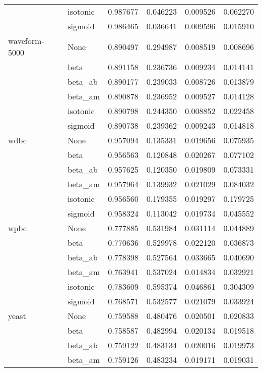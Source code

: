 \begin{tabular}{llrrrr}
        & isotonic &  0.987677 &  0.046223 &  0.009526 &  0.062270 \\
        & sigmoid &  0.986465 &  0.036641 &  0.009596 &  0.015910 \\
waveform-5000 & None &  0.890497 &  0.294987 &  0.008519 &  0.008696 \\
        & beta &  0.891158 &  0.236736 &  0.009234 &  0.014141 \\
        & beta\_ab &  0.890177 &  0.239033 &  0.008726 &  0.013879 \\
        & beta\_am &  0.890878 &  0.236952 &  0.009527 &  0.014128 \\
        & isotonic &  0.890798 &  0.244350 &  0.008852 &  0.022458 \\
        & sigmoid &  0.890738 &  0.239362 &  0.009243 &  0.014818 \\
wdbc & None &  0.957094 &  0.135331 &  0.019656 &  0.075935 \\
        & beta &  0.956563 &  0.120848 &  0.020267 &  0.077102 \\
        & beta\_ab &  0.957625 &  0.120350 &  0.019809 &  0.073331 \\
        & beta\_am &  0.957964 &  0.139932 &  0.021029 &  0.084032 \\
        & isotonic &  0.956560 &  0.179355 &  0.019297 &  0.179725 \\
        & sigmoid &  0.958324 &  0.113042 &  0.019734 &  0.045552 \\
wpbc & None &  0.777885 &  0.531984 &  0.031114 &  0.044889 \\
        & beta &  0.770636 &  0.529978 &  0.022120 &  0.036873 \\
        & beta\_ab &  0.778398 &  0.527564 &  0.033665 &  0.040690 \\
        & beta\_am &  0.763941 &  0.537024 &  0.014834 &  0.032921 \\
        & isotonic &  0.783609 &  0.595374 &  0.046861 &  0.304309 \\
        & sigmoid &  0.768571 &  0.532577 &  0.021079 &  0.033924 \\
yeast & None &  0.759588 &  0.480476 &  0.020501 &  0.020833 \\
        & beta &  0.758587 &  0.482994 &  0.020134 &  0.019518 \\
        & beta\_ab &  0.759122 &  0.483134 &  0.020016 &  0.019973 \\
        & beta\_am &  0.759126 &  0.483234 &  0.019171 &  0.019031 \\

\end{tabular}
